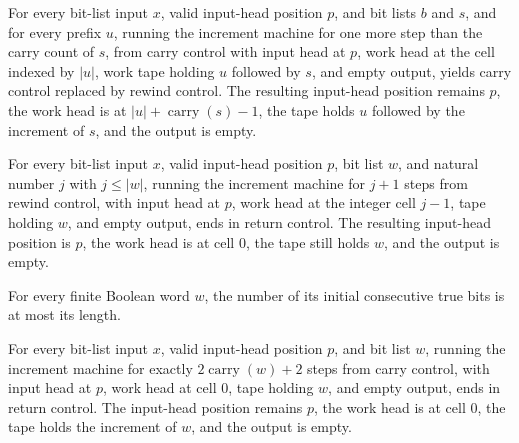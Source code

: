 \begin{lemma}
\label{Complexity.clCount_carry}
\leanok
{}
For every bit-list input $x$, valid input-head position $p$, and bit lists $b$ and $s$,
and for every prefix $u$, running the increment machine for one more step than the carry
count of $s$, from carry control with input head at $p$, work head at the cell indexed
by $|u|$, work tape holding $u$ followed by $s$, and empty output, yields carry control
replaced by rewind control. The resulting input-head position remains $p$, the work head
is at $|u|+\operatorname{carry}(s)-1$, the tape holds $u$ followed by the increment of
$s$, and the output is empty.
\end{lemma}

\begin{lemma}
\label{Complexity.clCount_rewind}
\leanok
{}
For every bit-list input $x$, valid input-head position $p$, bit list $w$, and natural
number $j$ with $j\leq |w|$, running the increment machine for $j+1$ steps from rewind
control, with input head at $p$, work head at the integer cell $j-1$, tape holding $w$,
and empty output, ends in return control. The resulting input-head position is $p$, the
work head is at cell $0$, the tape still holds $w$, and the output is empty.
\end{lemma}

\begin{lemma}
\label{Complexity.clCountCarry_le}
\leanok
{}
For every finite Boolean word $w$, the number of its initial consecutive true bits is at
most its length.
\end{lemma}

\begin{lemma}
\label{Complexity.clCount_run}
\leanok
{}
For every bit-list input $x$, valid input-head position $p$, and bit list $w$, running
the increment machine for exactly $2\operatorname{carry}(w)+2$ steps from carry control,
with input head at $p$, work head at cell $0$, tape holding $w$, and empty output, ends
in return control. The input-head position remains $p$, the work head is at cell $0$,
the tape holds the increment of $w$, and the output is empty.
\end{lemma}

